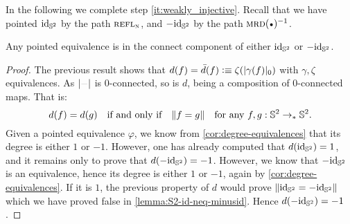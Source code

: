 \documentclass[english,a4paper]{lmcs}
\begin{document}
In the following we complete step \ref{it:weakly_injective}.
Recall that we have pointed $\mathord{\mathrm{id}}_{{\mathbb S^{2}}}$ by the path $\mathop{{\textsc{refl}}_{\textsc{n}}}$,
and $-\mathord{\mathrm{id}}_{{\mathbb S^{2}}}$ by the path $\inv{\mrd(\base)}$.
\begin{cor}
  Any pointed equivalence is in the connect component of either $\mathord{\mathrm{id}}_{{\mathbb S^{2}}}$ or $-\mathord{\mathrm{id}}_{{\mathbb S^{2}}}$.
  \label{cor:equivalence-conn-component}
\end{cor}
\begin{proof}
  The previous result shows that $d(f) = \bar d(f) \vcentcolon\equiv
  \zeta(\lvert\gamma(f)\rvert_0)$ with $\gamma, \zeta$ equivalences. As
  $\trunc\blank$ is $0$-connected, so is $d$, being a composition of
  $0$-connected maps. That is:
  \begin{displaymath}
    d(f) = d(g) \quad \text{if and only if}\quad
    \lVert f = g\rVert \quad \text{for any}\ f,g:{{\mathbb S^{2}}} \to_\ast{{\mathbb S^{2}}}.
  \end{displaymath}
  Given a pointed equivalence $\varphi$, we know from
  \cref{cor:degree-equivalences} that its degree is either $1$ or $-1$.
  However, one has already computed that $d(\mathord{\mathrm{id}}_{{\mathbb S^{2}}}) = 1$, and it remains only
  to prove that $d(-\mathord{\mathrm{id}}_{{\mathbb S^{2}}}) = -1$. However, we know that $-\mathord{\mathrm{id}}_{{\mathbb S^{2}}}$ is an
  equivalence, hence its degree is either $1$ or $-1$, again by
  \cref{cor:degree-equivalences}. If it is $1$, the previous property of $d$
  would prove $\lVert\mathord{\mathrm{id}}_{{\mathbb S^{2}}} = -\mathord{\mathrm{id}}_{{\mathbb S^{2}}}\rVert$ which we have proved false in
  \cref{lemma:S2-id-neq-minusid}. Hence $d(-\mathord{\mathrm{id}}_{{\mathbb S^{2}}}) = -1$.

\end{proof}
\end{document}
